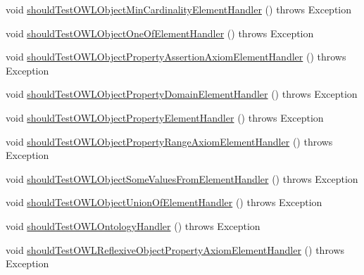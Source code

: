 \begin{DoxyCompactItemize}
\item 
void \hyperlink{classorg_1_1semanticweb_1_1owlapi_1_1contract_1_1_contract_owlxmlparser_test_ac4ca94272206f982356104e24f8c6e66}{should\-Test\-O\-W\-L\-Object\-Min\-Cardinality\-Element\-Handler} ()  throws Exception 
\item 
void \hyperlink{classorg_1_1semanticweb_1_1owlapi_1_1contract_1_1_contract_owlxmlparser_test_a78c876f7538498259440834cfa50e25e}{should\-Test\-O\-W\-L\-Object\-One\-Of\-Element\-Handler} ()  throws Exception 
\item 
void \hyperlink{classorg_1_1semanticweb_1_1owlapi_1_1contract_1_1_contract_owlxmlparser_test_a80274caa8010911c3744c9aee3bfc75e}{should\-Test\-O\-W\-L\-Object\-Property\-Assertion\-Axiom\-Element\-Handler} ()  throws Exception 
\item 
void \hyperlink{classorg_1_1semanticweb_1_1owlapi_1_1contract_1_1_contract_owlxmlparser_test_aa405cdd9b6f2cd3ebbcc9f2841581e37}{should\-Test\-O\-W\-L\-Object\-Property\-Domain\-Element\-Handler} ()  throws Exception 
\item 
void \hyperlink{classorg_1_1semanticweb_1_1owlapi_1_1contract_1_1_contract_owlxmlparser_test_acd691194d57c9921d07e30f4c42609d8}{should\-Test\-O\-W\-L\-Object\-Property\-Element\-Handler} ()  throws Exception 
\item 
void \hyperlink{classorg_1_1semanticweb_1_1owlapi_1_1contract_1_1_contract_owlxmlparser_test_a4c38cd988109ddf48cedae9477b112bf}{should\-Test\-O\-W\-L\-Object\-Property\-Range\-Axiom\-Element\-Handler} ()  throws Exception 
\item 
void \hyperlink{classorg_1_1semanticweb_1_1owlapi_1_1contract_1_1_contract_owlxmlparser_test_a2a0e8d53840d4d7cea3096cb6f37fa83}{should\-Test\-O\-W\-L\-Object\-Some\-Values\-From\-Element\-Handler} ()  throws Exception 
\item 
void \hyperlink{classorg_1_1semanticweb_1_1owlapi_1_1contract_1_1_contract_owlxmlparser_test_acc4c32e93f5f4ae3a91cf231e4ed7d48}{should\-Test\-O\-W\-L\-Object\-Union\-Of\-Element\-Handler} ()  throws Exception 
\item 
void \hyperlink{classorg_1_1semanticweb_1_1owlapi_1_1contract_1_1_contract_owlxmlparser_test_a982cb9c3f38b0579982af471ba0cac1d}{should\-Test\-O\-W\-L\-Ontology\-Handler} ()  throws Exception 
\item 
void \hyperlink{classorg_1_1semanticweb_1_1owlapi_1_1contract_1_1_contract_owlxmlparser_test_a6106397bf417907f5bf471a2b0b71754}{should\-Test\-O\-W\-L\-Reflexive\-Object\-Property\-Axiom\-Element\-Handler} ()  throws Exception 

\end{DoxyCompactItemize}

